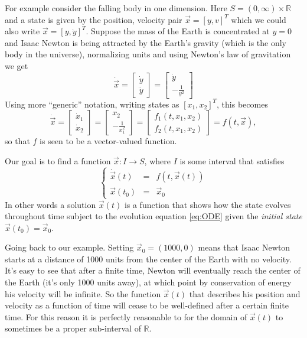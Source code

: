 \documentclass[10pt]{article}
\theoremstyle{definition}
\theoremstyle{remark}
\newcommand{\bbR}{\mathbb{R}}
\begin{document}
For example consider the falling body in one dimension. Here $S = (0,\infty)\times\bbR$ and a state is given by the position, velocity pair $\vec x=[y,v]^T$ which we could also write $\vec x = [y,\dot y]^T$. Suppose the mass of the Earth is concentrated at $y=0$ and Isaac Newton is being attracted by the Earth's gravity (which is the only body in the universe), normalizing units and using Newton's law of gravitation we get\[
\dot{\vec{x}} =
\begin{bmatrix}
  \dot y \\ \ddot y
\end{bmatrix}
 =
 \begin{bmatrix}
   \dot y \\ -\frac{1}{y^2}
 \end{bmatrix}
  \]
  Using more ``generic'' notation, writing states as $[x_1,x_2]^T$, this becomes
  \[
    \dot{\vec x} =
    \begin{bmatrix}
      \dot x_1\\\dot x_2
    \end{bmatrix}=
    \begin{bmatrix}
      x_2 \\ -\frac{1}{x_1^2}
    \end{bmatrix}=
    \begin{bmatrix}
      f_1(t,x_1,x_2)\\f_2(t,x_1,x_2)
    \end{bmatrix}= f(t,\vec x),   
  \] so that $f$ is seen to be a vector-valued function.

  Our goal is to find a function $\vec x: I \to S$, where $I$ is some interval that satisfies
  \begin{equation}
    \label{eq:Cauchy-prob}
    \left\{
      \begin{array}{lcl}
        \dot{\vec{x}}(t) & = & f(t,\vec x(t))\\
        \vec x(t_0) & = & \vec x_0
      \end{array}
    \right.
  \end{equation}
  In other words a solution $\vec x(t)$ is a function that shows how the state evolves throughout time subject to the evolution equation \ref{eq:ODE} given the \emph{initial state} $\vec x(t_0)= \vec x_0$.
  
  Going back to our example. Setting $\vec x_0 = (1000,0)$ means that Isaac Newton starts at a distance of 1000 units from the center of the Earth with no velocity. It's easy to see that after a finite time, Newton will eventually reach the center of the Earth (it's only 1000 units away), at which point by conservation of energy his velocity will be infinite. So the function $\vec x (t)$ that describes his position and velocity as a function of time will cease to be well-defined after a certain finite time. For this reason it is perfectly reasonable to for the domain of $\vec x(t)$ to sometimes be a proper sub-interval of $\bbR$.
  
\end{document}
